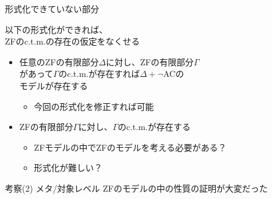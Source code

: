\documentclass[17pt]{beamer}
\begin{document}
\begin{frame}{形式化できていない部分}
    \vspace{-2pt}
    {\small 
        以下の形式化ができれば、\\ZFのc.t.m.の存在の仮定をなくせる
        \vspace{-4pt}
        \begin{itemize}
            \item 任意のZFの有限部分$\Delta$に対し、ZFの有限部分$\Gamma$\\
                  があって$\Gamma$のc.t.m.が存在すれば$\Delta + \neg$ACの\\
                  モデルが存在する
                  \begin{itemize}
                    \item 今回の形式化を修正すれば可能
                  \end{itemize}
        \vspace{-14pt}
        \item ZFの有限部分$\Gamma$に対し、$\Gamma$のc.t.m.が存在する
                  \begin{itemize}[itemsep=5pt]
                    \item ZFモデルの中でZFのモデルを考える必要がある？
                    \item 形式化が難しい？
                  \end{itemize}
                \end{itemize}
    }
\end{frame}

\begin{frame}{考察(2) メタ/対象レベル}
    \hspace{-0.5cm}ZFのモデルの中の性質の証明が大変だった
\end{frame}
\end{document}
